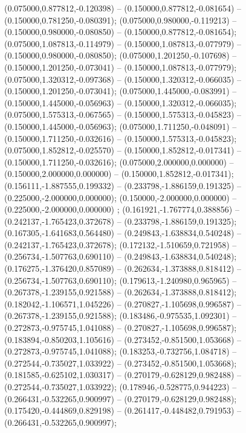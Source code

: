  (0.075000,0.877812,-0.120398) -- (0.150000,0.877812,-0.081654) -- (0.150000,0.781250,-0.080391);
 (0.075000,0.980000,-0.119213) -- (0.150000,0.980000,-0.080850) -- (0.150000,0.877812,-0.081654);
 (0.075000,1.087813,-0.114979) -- (0.150000,1.087813,-0.077979) -- (0.150000,0.980000,-0.080850);
 (0.075000,1.201250,-0.107698) -- (0.150000,1.201250,-0.073041) -- (0.150000,1.087813,-0.077979);
 (0.075000,1.320312,-0.097368) -- (0.150000,1.320312,-0.066035) -- (0.150000,1.201250,-0.073041);
 (0.075000,1.445000,-0.083991) -- (0.150000,1.445000,-0.056963) -- (0.150000,1.320312,-0.066035);
 (0.075000,1.575313,-0.067565) -- (0.150000,1.575313,-0.045823) -- (0.150000,1.445000,-0.056963);
 (0.075000,1.711250,-0.048091) -- (0.150000,1.711250,-0.032616) -- (0.150000,1.575313,-0.045823);
 (0.075000,1.852812,-0.025570) -- (0.150000,1.852812,-0.017341) -- (0.150000,1.711250,-0.032616);
 (0.075000,2.000000,0.000000) -- (0.150000,2.000000,0.000000) -- (0.150000,1.852812,-0.017341);
 (0.156111,-1.887555,0.199332) -- (0.233798,-1.886159,0.191325) -- (0.225000,-2.000000,0.000000);
 (0.150000,-2.000000,0.000000) -- (0.225000,-2.000000,0.000000) ;
 (0.161921,-1.767774,0.388856) -- (0.242137,-1.765423,0.372678) -- (0.233798,-1.886159,0.191325);
 (0.167305,-1.641683,0.564480) -- (0.249843,-1.638834,0.540248) -- (0.242137,-1.765423,0.372678);
 (0.172132,-1.510659,0.721958) -- (0.256734,-1.507763,0.690110) -- (0.249843,-1.638834,0.540248);
 (0.176275,-1.376420,0.857089) -- (0.262634,-1.373888,0.818412) -- (0.256734,-1.507763,0.690110);
 (0.179613,-1.240980,0.965965) -- (0.267378,-1.239155,0.921588) -- (0.262634,-1.373888,0.818412);
 (0.182042,-1.106571,1.045226) -- (0.270827,-1.105698,0.996587) -- (0.267378,-1.239155,0.921588);
 (0.183486,-0.975535,1.092301) -- (0.272873,-0.975745,1.041088) -- (0.270827,-1.105698,0.996587);
 (0.183894,-0.850203,1.105616) -- (0.273452,-0.851500,1.053668) -- (0.272873,-0.975745,1.041088);
 (0.183253,-0.732756,1.084718) -- (0.272544,-0.735027,1.033922) -- (0.273452,-0.851500,1.053668);
 (0.181585,-0.625102,1.030317) -- (0.270179,-0.628129,0.982488) -- (0.272544,-0.735027,1.033922);
 (0.178946,-0.528775,0.944223) -- (0.266431,-0.532265,0.900997) -- (0.270179,-0.628129,0.982488);
 (0.175420,-0.444869,0.829198) -- (0.261417,-0.448482,0.791953) -- (0.266431,-0.532265,0.900997);

